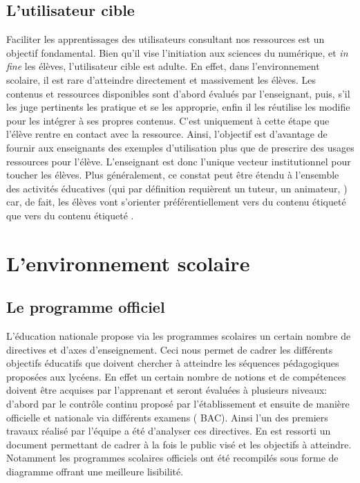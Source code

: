     \subsection{L'utilisateur cible}
        Faciliter les apprentissages des utilisateurs consultant nos ressources est un objectif fondamental. Bien qu'il vise l'initiation aux sciences du numérique, et \textit{in fine} les élèves, l'utilisateur cible est adulte. En effet, dans l'environnement scolaire, il est rare d'atteindre directement et massivement les élèves. Les contenus et ressources disponibles sont d'abord évalués par l'enseignant, puis, s'il les juge pertinents les pratique et se les approprie, enfin il les réutilise \etou les modifie pour les intégrer à ses propres contenus. C'est uniquement à cette étape que l'élève rentre en contact avec la ressource. Ainsi, l'objectif est d'avantage de fournir aux enseignants des exemples d'utilisation plus que de prescrire des usages \etou ressources  pour l'élève. L'enseignant est donc l'unique vecteur institutionnel pour toucher les élèves. Plus généralement, ce constat peut être étendu à l'ensemble des activités éducatives (qui par définition requièrent un tuteur, un animateur, \etc) car, de fait, les élèves vont s'orienter préférentiellement vers du contenu étiqueté  que vers du contenu étiqueté . 
\section{L'environnement scolaire}
    \subsection{Le programme officiel}\label{sec:programme-officiel}
            L'éducation nationale propose via les programmes scolaires un certain nombre de directives et d'axes d'enseignement. Ceci nous permet de cadrer les différents objectifs éducatifs que doivent chercher à atteindre les séquences pédagogiques proposées aux lycéens. En effet un certain nombre de notions et de compétences doivent être acquises par l'apprenant et seront évaluées à plusieurs niveaux: d'abord par le contrôle continu proposé par l'établissement et ensuite de manière officielle et nationale via différents examens ( \eg BAC). 
            Ainsi l'un des premiers travaux réalisé par l'équipe a été d'analyser ces directives. En est ressorti un document permettant de cadrer à la fois le public visé et les objectifs à atteindre. Notamment les programmes scolaires officiels ont été recompilés sous forme de diagramme offrant une meilleure lisibilité.
